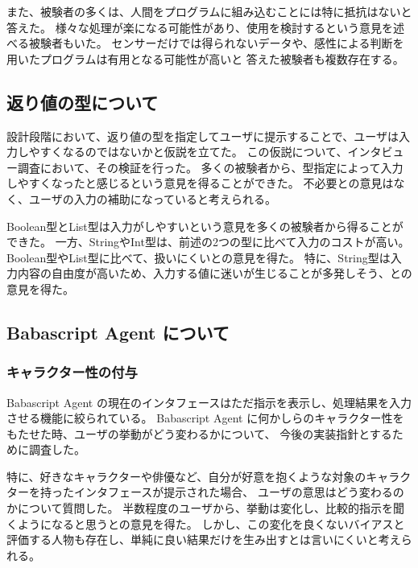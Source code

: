 また、被験者の多くは、人間をプログラムに組み込むことには特に抵抗はないと答えた。
様々な処理が楽になる可能性があり、使用を検討するという意見を述べる被験者もいた。
センサーだけでは得られないデータや、感性による判断を用いたプログラムは有用となる可能性が高いと
答えた被験者も複数存在する。

\subsection{返り値の型について}\label{ux8fd4ux308aux5024ux306eux578bux306bux3064ux3044ux3066}

設計段階において、返り値の型を指定してユーザに提示することで、ユーザは入力しやすくなるのではないかと仮説を立てた。
この仮説について、インタビュー調査において、その検証を行った。
多くの被験者から、型指定によって入力しやすくなったと感じるという意見を得ることができた。
不必要との意見はなく、ユーザの入力の補助になっていると考えられる。

Boolean型とList型は入力がしやすいという意見を多くの被験者から得ることができた。
一方、StringやInt型は、前述の2つの型に比べて入力のコストが高い。
Boolean型やList型に比べて、扱いにくいとの意見を得た。
特に、String型は入力内容の自由度が高いため、入力する値に迷いが生じることが多発しそう、との意見を得た。

\subsection{Babascript Agent
について}\label{babascript-agent-ux306bux3064ux3044ux3066}

\subsubsection{キャラクター性の付与}\label{ux30adux30e3ux30e9ux30afux30bfux30fcux6027ux306eux4ed8ux4e0e}

Babascript Agent
の現在のインタフェースはただ指示を表示し、処理結果を入力させる機能に絞られている。
Babascript Agent
に何かしらのキャラクター性をもたせた時、ユーザの挙動がどう変わるかについて、
今後の実装指針とするために調査した。

特に、好きなキャラクターや俳優など、自分が好意を抱くような対象のキャラクターを持ったインタフェースが提示された場合、
ユーザの意思はどう変わるのかについて質問した。
半数程度のユーザから、挙動は変化し、比較的指示を聞くようになると思うとの意見を得た。
しかし、この変化を良くないバイアスと評価する人物も存在し、単純に良い結果だけを生み出すとは言いにくいと考えられる。

